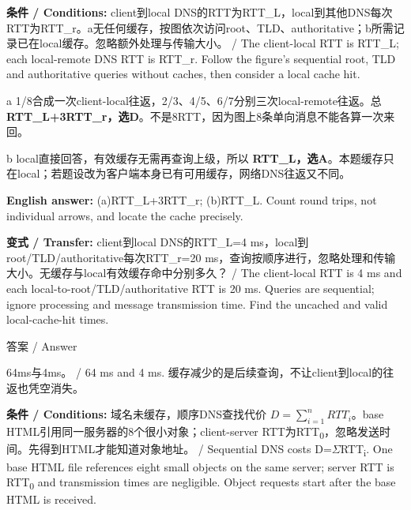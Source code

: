 

\textbf{条件 / Conditions:} client到local DNS的RTT为RTT\_L，local到其他DNS每次RTT为RTT\_r。a无任何缓存，按图依次访问root、TLD、authoritative；b所需记录已在local缓存。忽略额外处理与传输大小。 / The client-local RTT is RTT\_L; each local-remote DNS RTT is RTT\_r. Follow the figure's sequential root, TLD and authoritative queries without caches, then consider a local cache hit.




a 1/8合成一次client-local往返，2/3、4/5、6/7分别三次local-remote往返。总 \textbf{RTT\_L+3RTT\_r，选D}。不是8RTT，因为图上8条单向消息不能各算一次来回。


b local直接回答，有效缓存无需再查询上级，所以 \textbf{RTT\_L，选A}。本题缓存只在local；若题设改为客户端本身已有可用缓存，网络DNS往返又不同。


\textbf{English answer:} (a)RTT\_L+3RTT\_r; (b)RTT\_L. Count round trips, not individual arrows, and locate the cache precisely.


\textbf{变式 / Transfer:} client到local DNS的RTT\_L=4 ms，local到root/TLD/authoritative每次RTT\_r=20 ms，查询按顺序进行，忽略处理和传输大小。无缓存与local有效缓存命中分别多久？ / The client-local RTT is 4 ms and each local-to-root/TLD/authoritative RTT is 20 ms. Queries are sequential; ignore processing and message transmission time. Find the uncached and valid local-cache-hit times.



\begin{StudySolution}{答案 / Answer}


64ms与4ms。 / 64 ms and 4 ms. 缓存减少的是后续查询，不让client到local的往返也凭空消失。


\end{StudySolution}








\textbf{条件 / Conditions:} 域名未缓存，顺序DNS查找代价 \(D=\sum_{i=1}^n RTT_i\)。base HTML引用同一服务器的8个很小对象；client-server RTT为RTT\textsubscript{0}，忽略发送时间。先得到HTML才能知道对象地址。 / Sequential DNS costs D=\ensuremath{\Sigma}RTT\textsubscript{i}. One base HTML file references eight small objects on the same server; server RTT is RTT\textsubscript{0} and transmission times are negligible. Object requests start after the base HTML is received.

